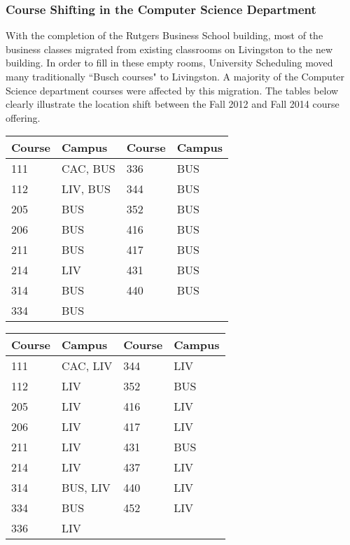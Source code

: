 \documentclass[12pt]{article}
\begin{document}
\subsubsection{Course Shifting in the Computer Science Department}
With the completion of the Rutgers Business School building, most of the business classes migrated from existing classrooms on Livingston to the new building. In order to fill in these empty rooms, University Scheduling moved many traditionally ``Busch courses" to Livingston. A majority of the Computer Science department courses were affected by this migration. The tables below clearly illustrate the location shift between the Fall 2012 and Fall 2014 course offering.
			
\begin{center}
	 \label{tab:title} 
	\begin{tabular} { | l | l | l | l | }
		\hline
		Course & 	Campus & Course & Campus \\ \hline
		111 & CAC, BUS & 336 & BUS \\ \hline
		112 & LIV, BUS & 344 & BUS \\ \hline
		205 & BUS & 352 & BUS \\ \hline	
		206 & BUS &	416 & BUS \\ \hline
		211 & BUS &	417 & BUS \\ \hline		
		214 & LIV &	431 & BUS \\ \hline		
		314 & BUS & 440 & BUS \\ \hline		
		334 & BUS & & \\
		\hline
	\end{tabular}
\end{center}
\begin{center}
	 \label{tab:asdf} 
	\begin{tabular}{ | l | l | l | l | }
		\hline
		Course & Campus & Course &	Campus \\ \hline
		111 & CAC, LIV & 344 & LIV \\ \hline
		112 & LIV & 352 & BUS \\ \hline
		205 & LIV & 416 & LIV \\ \hline
		206 & LIV & 417 & LIV \\ \hline
		211 & LIV & 431 & BUS \\ \hline
		214 & LIV & 437 & LIV \\ \hline
		314 & BUS, LIV & 440 & LIV \\ \hline
		334 & BUS & 452 & LIV \\ \hline
		336 & LIV & & \\ 
		\hline
	\end{tabular}
\end{center}
\end{document}
